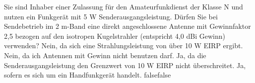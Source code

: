     {Sie sind Inhaber einer Zulassung für den Amateurfunkdienst der Klasse N und nutzen ein Funkgerät mit 5 W Senderausgangsleistung. Dürfen Sie bei Sendebetrieb im 2 m-Band eine direkt angeschlossene Antenne mit Gewinnfaktor 2,5 bezogen auf den isotropen Kugelstrahler (entspricht 4,0 dBi Gewinn) verwenden?}
    {Nein, da sich eine Strahlungsleistung von über 10 W EIRP ergibt.}
    {Nein, da ich Antennen mit Gewinn nicht benutzen darf.}
    {Ja, da die Senderausgangsleistung den Grenzwert von 10 W EIRP nicht überschreitet.}
    {Ja, sofern es sich um ein Handfunkgerät handelt.}
    {false}{false}